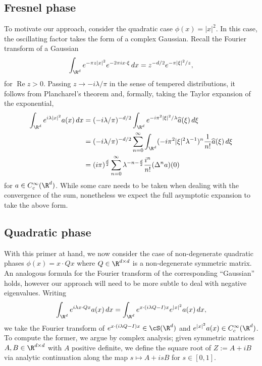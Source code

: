 \documentclass[reqno]{amsart}
\theoremstyle{definition}
\theoremstyle{remark}
\renewcommand{\Re}{\operatorname{Re}}
\begin{document}
\subsection{Fresnel phase}

To motivate our approach, consider the quadratic case $\phi(x) = |x|^2$. In this case, the oscillating factor takes the form of a complex Gaussian. Recall the Fourier transform of a Gaussian
	\[ \int_{\R^d} e^{- \pi z |x|^2} e^{-2\pi i x \cdot \xi} \, dx = z^{-d/2} e^{-\pi |\xi|^2/z}, \]
for $\Re z > 0$. Passing $z \to -i \lambda/\pi$ in the sense of tempered distributions, it follows from Plancharel's theorem and, formally, taking the Taylor expansion of the exponential, 
	\begin{align*}
		 \int_{\R^d} e^{i \lambda |x|^2} a(x) \, dx 
		 	&= (-i \lambda/\pi)^{-d/2} \int_{\R^d} e^{- i \pi^2|\xi|^2/\lambda} \widehat a(\xi) \, d\xi \\
		 	&= (-i \lambda/\pi)^{-d/2} \sum_{n = 0}^\infty  \int_{\R^d} ( {-i \pi^2 |\xi|^2}\lambda^{-1})^n \frac{1}{n!} \widehat a (\xi) \, d\xi \\
		 	&= (i \pi)^{\frac{d}{2}} \sum_{n = 0}^\infty \lambda^{-n -\frac{d}{2}} \frac{i^n}{n!} (\Delta^n a)(0)
	\end{align*}	 
for $a \in C^\infty_c (\R^d)$. While some care needs to be taken when dealing with the convergence of the sum, nonetheless we expect the full asymptotic expansion to take the above form. 

\subsection{Quadratic phase}
With this primer at hand, we now consider the case of non-degenerate quadratic phases $\phi(x) = x \cdot Qx$ where $Q \in \R^{d \times d}$ is a non-degenerate symmetric matrix. An analogous formula for the Fourier transform of the corresponding ``Gaussian'' holds, however our approach will need to be more subtle to deal with negative eigenvalues. Writing
	\[ \int_{\R^d} e^{i \lambda x \cdot Qx} a(x) \, dx = \int_{\R^d} e^{x \cdot (i \lambda Q - I) x} e^{|x|^2} a(x) \, dx, \]
we take the Fourier transform of $e^{x \cdot (i \lambda Q - I) x} \in \cS (\R^d)$ and $e^{|x|^2} a(x) \in C^\infty_c (\R^d)$. To compute the former, we argue by complex analysis; given symmetric matrices $A, B \in \R^{d \times d}$ with $A$ positive definite, we define the square root of $Z := A + iB$ via analytic continuation along the map $s \mapsto A + i s B$ for $s \in [0, 1]$. 
\end{document}
